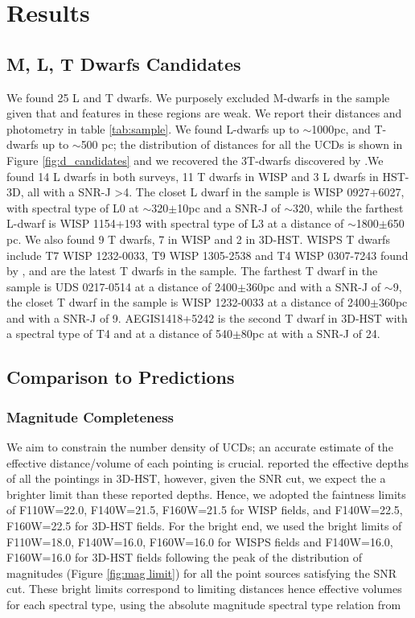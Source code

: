 \documentclass[manuscript]{aastex}
\begin{document}
\section {Results}\label{sec:results}
\subsection{M, L, T Dwarfs Candidates}  \label{candidates}

We found 25 L and T dwarfs. We purposely excluded M-dwarfs in the sample given that \wat and \meth features in these regions are weak. We report their distances and photometry in table \ref{tab:sample}. We found L-dwarfs up to $\sim$1000pc, and T-dwarfs up to $\sim$500 pc; the distribution of distances for all the UCDs is shown in Figure \ref{fig:d_candidates} and we recovered the 3T-dwarfs discovered by \citealt{2012ApJ...752L..14M}.We found 14 L dwarfs in both surveys, 11 T dwarfs in WISP and 3 L dwarfs in HST-3D, all with a SNR-J \textgreater4. The closet L dwarf in the sample is WISP 0927+6027, with spectral type of L0 at $\sim$320$\pm$10pc and a SNR-J of $\sim$320, while the farthest L-dwarf is WISP 1154+193 with spectral type of L3 at a distance of $\sim$1800$\pm$650 pc. We also found 9 T dwarfs, 7 in WISP and 2 in 3D-HST. WISPS T dwarfs include T7 WISP 1232-0033, T9 WISP 1305-2538 and T4 WISP 0307-7243 found by \citealt{2012ApJ...752L..14M}, and are the latest T dwarfs in the sample. The farthest T dwarf in the sample is UDS 0217-0514 at a distance of 2400$\pm$360pc and with a SNR-J of $\sim$9, the closet T dwarf in the sample is WISP 1232-0033 at a distance of 2400$\pm$360pc and with a SNR-J of 9. AEGIS1418+5242 is the second T dwarf in 3D-HST with a spectral type of T4 and at a distance of 540$\pm$80pc at with a SNR-J of 24.

\subsection{Comparison to Predictions}

\subsubsection{Magnitude Completeness}\label{mag_limits}

We aim to constrain the number density of UCDs; an accurate estimate of the effective distance/volume of each pointing is crucial.  \citealt{Momcheva2016} reported the effective depths of all the pointings in 3D-HST, however, given the SNR cut, we expect the a brighter limit than these reported depths. Hence, we adopted the faintness limits of F110W=22.0, F140W=21.5, F160W=21.5 for WISP fields, and  F140W=22.5, F160W=22.5 for 3D-HST fields. For the bright end, we used the bright limits of F110W=18.0, F140W=16.0, F160W=16.0 for WISPS fields and F140W=16.0, F160W=16.0 for 3D-HST fields following the peak of the distribution of magnitudes (Figure \ref{fig:mag limit}) for all the point sources satisfying the SNR cut. These bright limits correspond to limiting distances hence effective volumes for each spectral type, using the absolute magnitude spectral type relation from \citealt{2012ApJS..201...19D} 
\end{document}
